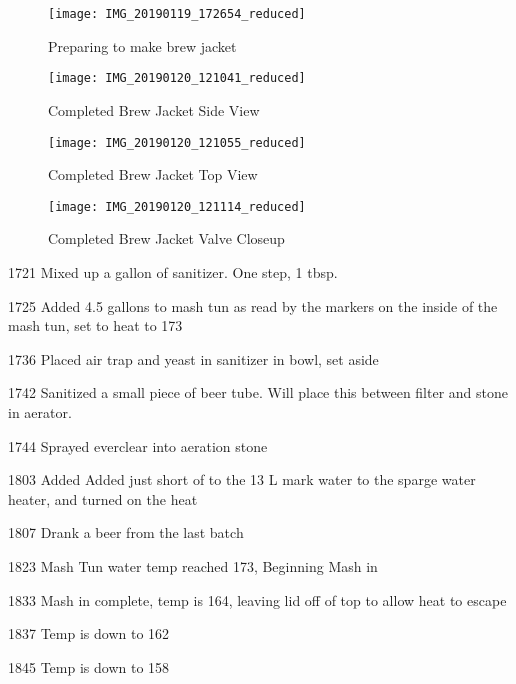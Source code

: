 \begin{figure}[H]
  \centering
  \texttt{[image: IMG\_20190119\_172654\_reduced]}
  \caption{Preparing to make brew jacket}\label{fig:brewjacket:prep}
\end{figure}

\begin{figure}[H]
  \centering
  \texttt{[image: IMG\_20190120\_121041\_reduced]}
  \caption{Completed Brew Jacket Side View}\label{fig:brewjacket:side}
\end{figure}

\begin{figure}[H]
  \centering
  \texttt{[image: IMG\_20190120\_121055\_reduced]}
  \caption{Completed Brew Jacket Top View}\label{fig:brewjacket:top}
\end{figure}

\begin{figure}[H]
  \centering
  \texttt{[image: IMG\_20190120\_121114\_reduced]}
  \caption{Completed Brew Jacket Valve Closeup}\label{fig:brewjacket:valve}
\end{figure}

\def\todaysdate{20190126}
\newday{\todaysdate}\label{\todaysdate}

\FloatBarrier{}
1721 Mixed up a gallon of sanitizer.  One step, 1 tbsp.

1725 Added 4.5 gallons to mash tun as read by the markers on the inside of the mash tun, set to heat to 173

1736 Placed air trap and yeast in sanitizer in bowl, set aside

1742 Sanitized a small piece of beer tube.  Will place this between filter and stone in aerator.

1744 Sprayed everclear into aeration stone

1803 Added Added just short of to the 13 L mark water to the sparge water heater, and turned on the heat

1807 Drank a beer from the last batch

1823 Mash Tun water temp reached 173, Beginning Mash in

1833 Mash in complete, temp is 164, leaving lid off of top to allow heat to escape

1837 Temp is down to 162

1845 Temp is down to 158

